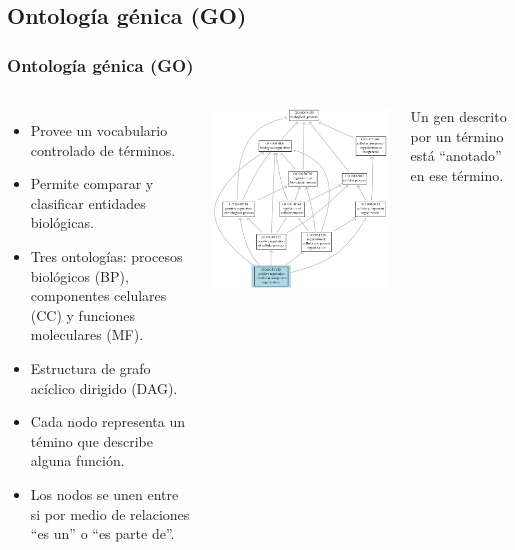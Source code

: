 \documentclass[serif,9pt, t]{beamer}
\newcommand\Fontvi{\fontsize{7}{7.2}\selectfont}
\begin{document}
\subsection{Ontología génica (GO)}
\begin{frame}\frametitle{Ontología génica (GO)}
\begin{columns}[T]
	\begin{itemize}
		\item Provee un vocabulario controlado de términos.
		\item Permite comparar y clasificar entidades biológicas.
		\item Tres ontologías: procesos biológicos (BP), componentes celulares (CC) y funciones moleculares (MF).
		\item Estructura de grafo acíclico dirigido (DAG).
		\item Cada nodo representa un témino que describe alguna función.
		\item Los nodos se unen entre si por medio de relaciones ``es un'' o ``es parte de''.
	\end{itemize}
	\centering
	\includegraphics[width=1.1\textwidth]{ejemplo_de_go}	
	
	\medskip
	\Fontvi
	Un gen descrito por un término está ``anotado'' en ese término.	
\end{columns}
\end{frame}
\end{document}
